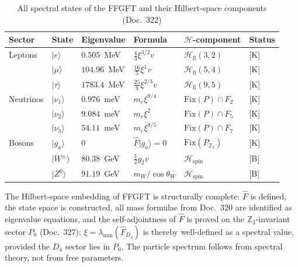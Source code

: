 \begin{table}[h!]
\centering
\caption{All spectral states of the FFGFT and their Hilbert-space
  components (Doc.~322)}
\label{tab:spectral}
\begin{tabular}{llllll}
\toprule
Sector & State & Eigenvalue & Formula &
  $\mathcal{H}$-component & Status \\
\midrule
Leptons
  & $|e\rangle$    & $0.505$~MeV  & $\frac{4}{3}\xi^{3/2}v$
    & $\mathcal{H}_{\mathrm{fl}}(3,2)$ & [K] \\
  & $|\mu\rangle$  & $104.96$~MeV & $\frac{16}{5}\xi^1 v$
    & $\mathcal{H}_{\mathrm{fl}}(5,4)$ & [K] \\
  & $|\tau\rangle$ & $1783.4$~MeV & $\frac{25}{9}\xi^{2/3}v$
    & $\mathcal{H}_{\mathrm{fl}}(9,5)$ & [K] \\
\midrule
Neutrinos
  & $|\nu_1\rangle$ & $0.976$~meV & $m_e\xi^{9/4}$
    & $\mathrm{Fix}(P)\cap F_2$ & [K] \\
  & $|\nu_2\rangle$ & $9.084$~meV & $m_e\xi^2$
    & $\mathrm{Fix}(P)\cap F_5$ & [K] \\
  & $|\nu_3\rangle$ & $54.11$~meV & $m_e\xi^{9/5}$
    & $\mathrm{Fix}(P)\cap F_7$ & [K] \\
\midrule
Bosons
  & $|g_a\rangle$   & $0$          & $\hat{F}|g_a\rangle=0$
    & $\mathrm{Fix}(P_{\mathbb{Z}_3})$ & [K] \\
  & $|W^\pm\rangle$ & $80.38$~GeV  & $\frac{1}{2}g_2 v$
    & $\mathcal{H}_{\mathrm{spin}}$ & [B] \\
  & $|Z^0\rangle$   & $91.19$~GeV  & $m_W/\!\cos\theta_W$
    & $\mathcal{H}_{\mathrm{spin}}$ & [B] \\
\bottomrule
\end{tabular}
\end{table}

\begin{keyresult}
The Hilbert-space embedding of FFGFT is structurally complete:
$\hat{F}$ is defined, the state space is constructed, all mass
formulae from Doc.~320 are identified as eigenvalue equations, and the
self-adjointness of $\hat{F}$ is proved on the $\mathbb{Z}_3$-invariant sector $P_0$ (Doc.~327):
$\xi = \lambda_{\min}(\hat{F}_{D_4})$ is thereby well-defined as a
spectral value, provided the $D_4$ sector lies in $P_0$.
The particle spectrum follows from spectral theory, not from
free parameters.
\end{keyresult}

